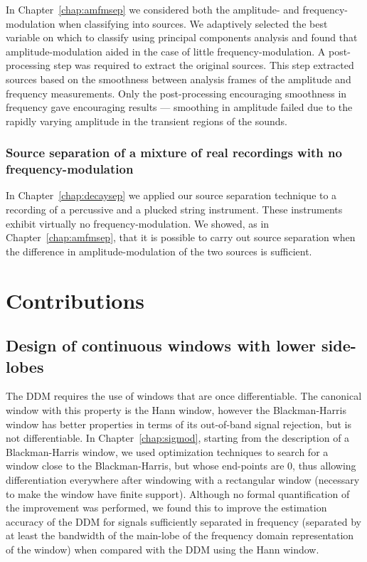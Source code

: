 In Chapter~\ref{chap:amfmsep} we considered both the amplitude- and
frequency-modulation when classifying into sources. We adaptively selected the
best variable on which to classify using principal components analysis and found
that amplitude-modulation aided in the case of little frequency-modulation. A
post-processing step was required to extract the original sources. This step
extracted sources based on the smoothness between analysis frames of the
amplitude and frequency measurements.  Only the post-processing encouraging
smoothness in frequency gave encouraging results --- smoothing in amplitude
failed due to the rapidly varying amplitude in the transient regions of the
sounds.

\subsubsection{Source separation of a mixture of real recordings with no
frequency-modulation}

In Chapter~\ref{chap:decaysep} we applied our source separation technique
to a recording of a percussive and a plucked string instrument. These
instruments exhibit virtually no frequency-modulation. We showed, as in
Chapter~\ref{chap:amfmsep}, that it is
possible to carry out source separation when the difference in
amplitude-modulation of the two sources is sufficient. 

\section{Contributions}

\subsection{Design of continuous windows with lower side-lobes}

The DDM requires the use of windows that are once differentiable. The canonical
window with this property is the Hann window, however the Blackman-Harris window
has better properties in terms of its out-of-band signal rejection, but is not
differentiable. In
Chapter~\ref{chap:sigmod}, starting
from the description of a Blackman-Harris window, we used optimization
techniques to search for a window close to the Blackman-Harris, but whose
end-points are 0, thus allowing differentiation everywhere after windowing with
a rectangular window (necessary to make the window have finite support).
Although no formal quantification of the improvement was performed, we found
this to improve the estimation accuracy of the DDM for signals sufficiently
separated in frequency (separated by at least the bandwidth of the main-lobe of
the frequency domain representation of the window) when compared with the DDM
using the Hann window.

